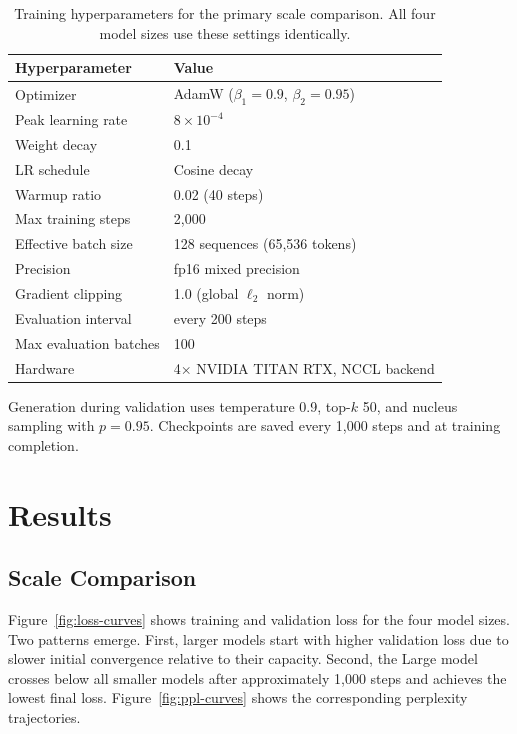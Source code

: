 \documentclass{article}
\begin{document}
\begin{table}[H]
\centering
\small
\caption{Training hyperparameters for the primary scale comparison. All four model sizes use these settings identically.}
\label{tab:training}
\begin{tabular}{ll}
\toprule
Hyperparameter & Value \\
\midrule
Optimizer & AdamW ($\beta_1{=}0.9$, $\beta_2{=}0.95$) \\
Peak learning rate & $8 \times 10^{-4}$ \\
Weight decay & 0.1 \\
LR schedule & Cosine decay \\
Warmup ratio & 0.02 (40 steps) \\
Max training steps & 2{,}000 \\
Effective batch size & 128 sequences (65{,}536 tokens) \\
Precision & fp16 mixed precision \\
Gradient clipping & 1.0 (global $\ell_2$ norm) \\
Evaluation interval & every 200 steps \\
Max evaluation batches & 100 \\
Hardware & 4$\times$ NVIDIA TITAN RTX, NCCL backend \\
\bottomrule
\end{tabular}
\end{table}

Generation during validation uses temperature 0.9, top-$k$ 50, and nucleus sampling with $p{=}0.95$. Checkpoints are saved every 1{,}000 steps and at training completion.
\FloatBarrier

\section{Results}

\subsection{Scale Comparison}

Figure~\ref{fig:loss-curves} shows training and validation loss for the four model sizes. Two patterns emerge. First, larger models start with higher validation loss due to slower initial convergence relative to their capacity. Second, the Large model crosses below all smaller models after approximately 1{,}000 steps and achieves the lowest final loss. Figure~\ref{fig:ppl-curves} shows the corresponding perplexity trajectories.
\end{document}
